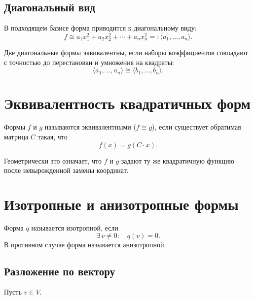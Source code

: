 \documentclass[12pt]{article}
\begin{document}
    \subsection{Диагональный вид}
    
    В подходящем базисе форма приводится к диагональному виду:
    \[
    f \cong a_1 x_1^2 + a_2 x_2^2 + \cdots + a_n x_n^2 =: \langle a_1, \dots,a_n \rangle.
    \]
    
    \begin{definition}
        Две диагональные формы эквивалентны, если наборы коэффициентов совпадают с точностью до перестановки и умножения на квадраты:
        \[
        \langle a_1, \dots, a_n \rangle \cong \langle b_1, \dots, b_n \rangle.
        \]
    \end{definition}
    
    \section{Эквивалентность квадратичных форм}
    
    \begin{definition}[Эквивалентность]
        Формы $f$ и $g$ называются эквивалентными ($f \cong g$), если существует обратимая матрица $C$ такая, что
        \[
        f(x) = g(C \cdot x).
        \]
    \end{definition}
    
    Геометрически это означает, что $f$ и $g$ задают ту же квадратичную функцию после невырожденной замены координат.
    
    \section{Изотропные и анизотропные формы}
    
    \begin{definition}
        Форма $q$ называется изотропной, если
        \[
        \exists\, v \neq 0: \quad q(v) = 0.
        \]
        В противном случае форма называется анизотропной.
    \end{definition}
    
    \subsection{Разложение по вектору}
    
    Пусть $v\in V$.
    
\end{document}
